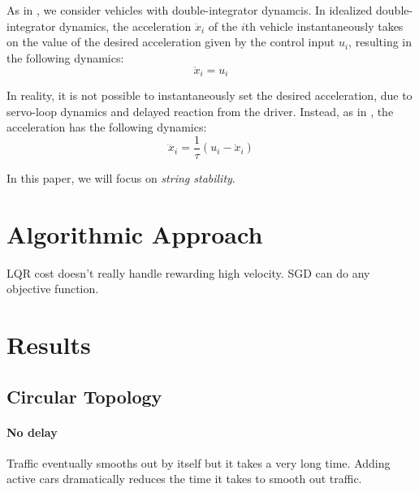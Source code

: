 \documentclass[11pt]{article}
\newcommand{\mb}{\mathbf}
\begin{document}
\begin{multicols}{2}
As in \cite{Peng}, we consider vehicles with double-integrator dynamcis. In idealized double-integrator dynamics, the acceleration $\ddot{x}_i$ of the $i$th vehicle instantaneously takes on the value of the desired acceleration given by the control input $u_i$, resulting in the following dynamics:
\[\ddot{x}_i = u_i\]

In reality, it is not possible to instantaneously set the desired acceleration, due to servo-loop dynamics and delayed reaction from the driver. Instead, as in \cite{Peng}, the acceleration has the following dynamics:
\[\dddot{x}_i = \frac{1}{\tau}(u_i - \ddot{x}_i)\]

In this paper, we will focus on {\em string stability}.

\section{Algorithmic Approach}

LQR cost doesn't really handle rewarding high velocity. SGD can do any objective function.

\section{Results}

\subsection{Circular Topology}

\paragraph{No delay} Traffic eventually smooths out by itself but it takes a very long time. Adding active cars dramatically reduces the time it takes to smooth out traffic. 


\end{multicols}
\end{document}
